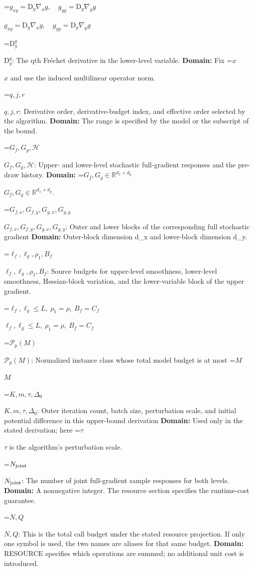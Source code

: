 \documentclass[10pt,a4paper]{article}
\newcommand{\AtlasMath}[1]{\par\begingroup\centering\setbox0=\hbox{$\displaystyle #1$}\ifdim\wd0>1.4\linewidth\typeout{ATLAS WIDE FORMULA: \the\wd0}\fi\ifdim\wd0>\linewidth\resizebox{\linewidth}{!}{\box0}\else\box0\fi\par\endgroup}
\newcommand{\AtlasInlineMath}[1]{\begingroup\setbox0=\hbox{$#1$}\ifdim\wd0>.4\linewidth\endgroup\AtlasMath{#1}\else\endgroup$#1$\fi}
\begin{document}
\AtlasInlineMath{g_{xy}=\mathrm D_y\nabla_xg,\quad g_{yy}=\mathrm D_y\nabla_yg}

\AtlasInlineMath{\mathrm D_y^q}: The qth Fréchet derivative in the lower-level variable. \textbf{Domain:} Fix \AtlasInlineMath{x} and use the induced multilinear operator norm.

\AtlasInlineMath{q,j,r}: Derivative order, derivative-budget index, and effective order selected by the algorithm. \textbf{Domain:} The range is specified by the model or the subscript of the bound.

\AtlasInlineMath{G_f,G_g,\mathcal H}: Upper- and lower-level stochastic full-gradient responses and the pre-draw history. \textbf{Domain:} \AtlasInlineMath{G_f,G_g\in\mathbb R^{d_x+d_y}}.

\AtlasInlineMath{G_{f,x},G_{f,y},G_{g,x},G_{g,y}}: Outer and lower blocks of the corresponding full stochastic gradient \textbf{Domain:} Outer-block dimension d\_x and lower-block dimension d\_y.

\AtlasInlineMath{\ell_f,\ell_g,\rho_1,B_f}: Source budgets for upper-level smoothness, lower-level smoothness, Hessian-block variation, and the lower-variable block of the upper gradient.

\AtlasInlineMath{\ell_f,\ell_g\le L,\ \rho_1=\rho,\ B_f=C_f}

\AtlasInlineMath{\mathcal P_p(M)}: Normalized instance class whose total model budget is at most \AtlasInlineMath{M}

\AtlasInlineMath{K,m,\tau,\Delta_0}: Outer iteration count, batch size, perturbation scale, and initial potential difference in this upper-bound derivation \textbf{Domain:} Used only in the stated derivation; here \AtlasInlineMath{\tau} is the algorithm's perturbation scale.

\AtlasInlineMath{N_{\rm joint}}: The number of joint full-gradient sample responses for both levels. \textbf{Domain:} A nonnegative integer. The resource section specifies the runtime-cost guarantee.

\AtlasInlineMath{N,Q}: This is the total call budget under the stated resource projection. If only one symbol is used, the two names are aliases for that same budget. \textbf{Domain:} RESOURCE specifies which operations are summed; no additional unit cost is introduced.
\end{document}
